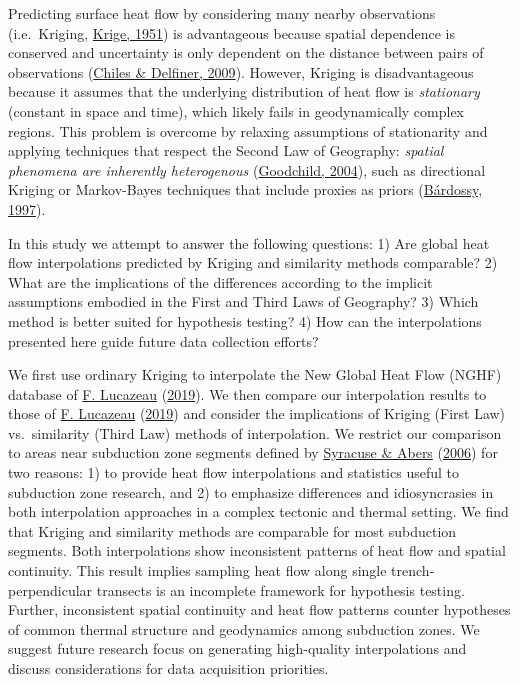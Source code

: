 \documentclass[draft,linenumbers]{agujournal2018}
\begin{document}
Predicting surface heat flow by considering many nearby observations
(i.e.~Kriging, \protect\hyperlink{ref-krige1951}{Krige, 1951}) is
advantageous because spatial dependence is conserved and uncertainty is
only dependent on the distance between pairs of observations
(\protect\hyperlink{ref-chiles2009}{Chiles \& Delfiner, 2009}). However,
Kriging is disadvantageous because it assumes that the underlying
distribution of heat flow is \emph{stationary} (constant in space and
time), which likely fails in geodynamically complex regions. This
problem is overcome by relaxing assumptions of stationarity and applying
techniques that respect the Second Law of Geography: \emph{spatial
phenomena are inherently heterogenous}
(\protect\hyperlink{ref-goodchild2004}{Goodchild, 2004}), such as
directional Kriging or Markov-Bayes techniques that include proxies as
priors (\protect\hyperlink{ref-bardossy1997}{Bárdossy, 1997}).

In this study we attempt to answer the following questions: 1) Are
global heat flow interpolations predicted by Kriging and similarity
methods comparable? 2) What are the implications of the differences
according to the implicit assumptions embodied in the First and Third
Laws of Geography? 3) Which method is better suited for hypothesis
testing? 4) How can the interpolations presented here guide future data
collection efforts?

We first use ordinary Kriging to interpolate the New Global Heat Flow
(NGHF) database of \protect\hyperlink{ref-lucazeau2019}{F. Lucazeau}
(\protect\hyperlink{ref-lucazeau2019}{2019}). We then compare our
interpolation results to those of
\protect\hyperlink{ref-lucazeau2019}{F. Lucazeau}
(\protect\hyperlink{ref-lucazeau2019}{2019}) and consider the
implications of Kriging (First Law) vs.~similarity (Third Law) methods
of interpolation. We restrict our comparison to areas near subduction
zone segments defined by \protect\hyperlink{ref-syracuse2006}{Syracuse
\& Abers} (\protect\hyperlink{ref-syracuse2006}{2006}) for two reasons:
1) to provide heat flow interpolations and statistics useful to
subduction zone research, and 2) to emphasize differences and
idiosyncrasies in both interpolation approaches in a complex tectonic
and thermal setting. We find that Kriging and similarity methods are
comparable for most subduction segments. Both interpolations show
inconsistent patterns of heat flow and spatial continuity. This result
implies sampling heat flow along single trench-perpendicular transects
is an incomplete framework for hypothesis testing. Further, inconsistent
spatial continuity and heat flow patterns counter hypotheses of common
thermal structure and geodynamics among subduction zones. We suggest
future research focus on generating high-quality interpolations and
discuss considerations for data acquisition priorities.
\end{document}
